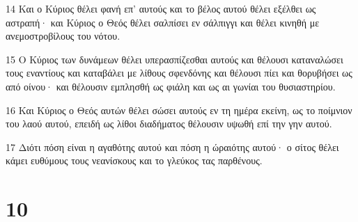 \par 14 Και ο Κύριος θέλει φανή επ' αυτούς και το βέλος αυτού θέλει εξέλθει ως αστραπή· και Κύριος ο Θεός θέλει σαλπίσει εν σάλπιγγι και θέλει κινηθή με ανεμοστροβίλους του νότου.
\par 15 Ο Κύριος των δυνάμεων θέλει υπερασπίζεσθαι αυτούς και θέλουσι καταναλώσει τους εναντίους και καταβάλει με λίθους σφενδόνης και θέλουσι πίει και θορυβήσει ως από οίνου· και θέλουσιν εμπλησθή ως φιάλη και ως αι γωνίαι του θυσιαστηρίου.
\par 16 Και Κύριος ο Θεός αυτών θέλει σώσει αυτούς εν τη ημέρα εκείνη, ως το ποίμνιον του λαού αυτού, επειδή ως λίθοι διαδήματος θέλουσιν υψωθή επί την γην αυτού.
\par 17 Διότι πόση είναι η αγαθότης αυτού και πόση η ώραιότης αυτού· ο σίτος θέλει κάμει ευθύμους τους νεανίσκους και το γλεύκος τας παρθένους.

\chapter{10}


